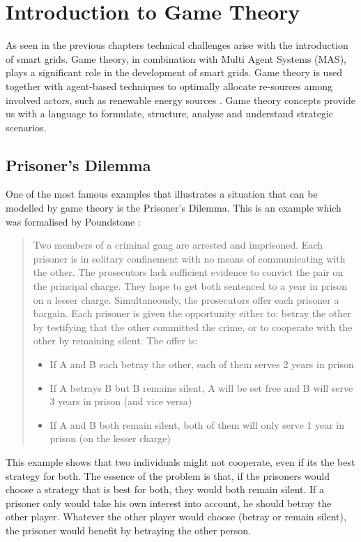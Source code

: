 \section{Introduction to Game Theory}
As seen in the previous chapters technical challenges arise with the introduction of smart grids. Game theory, in combination with Multi Agent Systems (MAS), plays a significant role in the development of smart grids. Game theory is used together with agent-based techniques to optimally allocate re-sources among involved actors, such as renewable energy sources \cite{nguyen2013game}. Game theory concepts provide us with a language to formulate, structure, analyse and understand strategic scenarios.


\subsection{Prisoner's Dilemma}
One of the most famous examples that illustrates a situation that can be modelled by game theory is the Prisoner's Dilemma. This is an example which was formalised by Poundstone \cite{poundstone}: 

\begin{quote}
Two members of a criminal gang are arrested and imprisoned. Each prisoner is in solitary confinement with no means of communicating with the other. The prosecutors lack sufficient evidence to convict the pair on the principal charge. They hope to get both sentenced to a year in prison on a lesser charge. Simultaneously, the prosecutors offer each prisoner a bargain. Each prisoner is given the opportunity either to: betray the other by testifying that the other committed the crime, or to cooperate with the other by remaining silent. The offer is:
	\begin{itemize}
		\item If A and B each betray the other, each of them serves 2 years in prison
		\item If A betrays B but B remains silent, A will be set free and B will serve 3 years in prison (and vice versa)
		\item If A and B both remain silent, both of them will only serve 1 year in prison (on the lesser charge)
	\end{itemize}	
\end{quote}

This example shows that two individuals might not cooperate, even if its the best strategy for both. The essence of the problem is that, if the prisoners would choose a strategy that is best for both, they would both remain silent. If a prisoner only would take his own interest into account, he should betray the other player. Whatever the other player would choose (betray or remain silent), the prisoner would benefit by betraying the other person.

